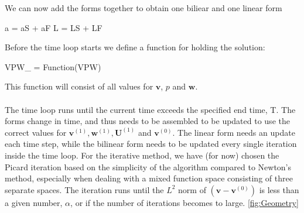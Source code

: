 We can now add the forms together to obtain one biliear and one linear form
\begin{cverbatim}
a = aS + aF 
L = LS + LF
\end{cverbatim}
Before the time loop starts we define a function for holding the solution:
\begin{cverbatim}
VPW_ = Function(VPW)
\end{cverbatim}
This function will consist of all values for $\mathbf{v}$, $p$ and $\mathbf{w}$.
\\
\\
The time loop runs until the current time exceeds the specified end time, T. The forms change in time, and thus needs to be assembled to be updated to use the correct values for $\mathbf{v}^{(1)}, \mathbf{w}^{(1)}, \mathbf{U}^{(1)}$ and $\mathbf{v}^{(0)}$. The linear form needs an update each time step, while the bilinear form needs to be updated every single iteration inside the time loop. For the iterative method, we have (for now) chosen the Picard iteration based on the simplicity of the algorithm compared to Newton's method, especially when dealing with a mixed function space consisting of three separate spaces. The iteration runs until the $L^2$ norm of $(\mathbf{v}-\mathbf{v}^({0}))$ is less than a given number, $\alpha$, or if the number of iterations becomes to large. 
\ref{fig:Geometry}


